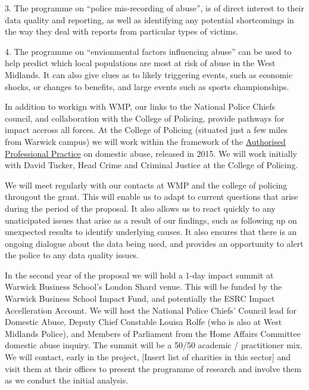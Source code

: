 \documentclass[11pt, a4paper]{article}
\begin{document}
3. The programme on ``police mis-recording of abuse'', is of direct interest to their data quality and reporting, as well as identifying any potential shortcomings in the way they deal with reports from particular types of victims. 

4. The programme on ``envionmental factors influencing abuse'' can be used to help predict which local populations are most at risk of abuse in the West Midlands. It can also give clues as to likely triggering events, such as economic shocks, or changes to benefits, and large events such as sports championships.

In addition to workign with WMP, our links to the National Police Chiefs council, and collaboration with the College of Policing, provide pathways for impact accross all forces. At the College of Policing (situated just a few miles from Warwick campus) we will work within the framework of the \href{https://www.app.college.police.uk/app-content/major-investigation-and-public-protection/domestic-abuse/introduction/) and the revision of the existing DASH risk assessment tool for domestic abuse. (https://whatworks.college.police.uk/Research/Documents/DA_risk_assessment_pilot.pdf}{Authorised Professional Practice} on domestic abuse, released in 2015. We will work initially with David Tucker, Head Crime and Criminal Justice at the College of Policing.

We will meet regularly with our contacts at WMP and the college of policing througout the grant. This will enable us to adapt to current questions that arise during the period of the proposal. It also allows us to react quickly to any unaticipated issues that arise as a result of our findings, such as following up on unexpected results to identify underlying causes. It also ensures that there is an ongoing dialogue about the data being used, and provides an opportunity to alert the police to any data quality issues.


In the second year of the proposal we will hold a 1-day impact summit at Warwick Business School's London Shard venue. This will be funded by the Warwick Business School Impact Fund, and potentially the ESRC Impact Accelleration Account. We will host the National Police Chiefs' Council lead for Domestic Abuse, Deputy Chief Constable Louisa Rolfe (who is also at West Midlands Police), and Members of Parliament from the Home Affairs Committee domestic abuse inquiry. The summit will be a 50/50 academic / practitioner mix. We will contact, early in the project, [Insert list of charities in this sector] and visit them at their offices to present the programme of research and involve them as we conduct the initial analysis.
\end{document}
